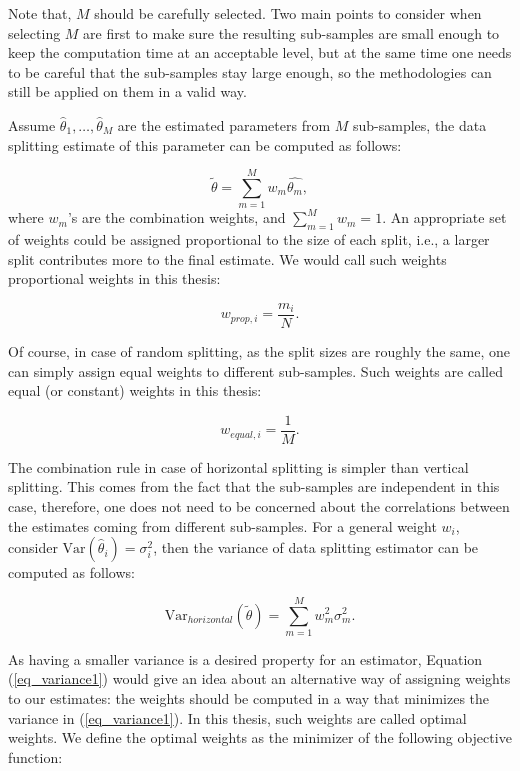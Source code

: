 \documentclass[11pt,a5paper,twoside]{book}
\begin{document}
Note that, $M$ should be carefully selected. Two main points to consider when selecting $M$ are first to make sure the resulting sub-samples are small enough to keep the computation time at an acceptable level, but at the same time one needs to be careful that the sub-samples stay large enough, so the methodologies can still be applied on them in a valid way.

Assume $\widehat{\theta}_1, \ldots, \widehat{\theta}_M$ are the estimated parameters from $M$ sub-samples, the data splitting estimate of this parameter can be computed as follows:

\begin{equation}
\label{eq_estimate}
\widetilde{\theta} = \sum_{m=1}^M w_m\widehat{\theta_m},
\end{equation}
where $w_m$'s are the combination weights, and $\sum_{m=1}^M w_m = 1$. An appropriate set of weights could be assigned proportional to the size of each split, i.e., a larger split contributes more to the final estimate. We would call such weights proportional weights in this thesis:

\begin{equation}
\label{eq_prop_w} 
w_{prop, i} = \frac{m_i}{N}.
\end{equation}

Of course, in case of random splitting, as the split sizes are roughly the same, one can simply assign equal weights to different sub-samples. Such weights are called equal (or constant) weights in this thesis:

\begin{equation}
\label{eq_equal_w}
w_{equal,i} = \frac{1}{M}.
\end{equation}

The combination rule in case of horizontal splitting is simpler than vertical splitting. This comes from the fact that the sub-samples are independent in this case, therefore, one does not need to be concerned about the correlations between the estimates coming from different sub-samples. For a general weight $w_i$, consider $\mathrm{Var}(\widehat{\theta}_i) = \sigma^2_i$, then the variance of data splitting estimator can be computed as follows:

\begin{equation}
\label{eq_variance1}
\mathrm{Var}_{horizontal}(\widetilde{\theta}) = \sum_{m=1}^M w_m^2 \sigma_m^2.
\end{equation}

As having a smaller variance is a desired property for an estimator, Equation (\ref{eq_variance1}) would give an idea about an alternative way of assigning weights to our estimates: the weights should be computed in a way that minimizes the variance in (\ref{eq_variance1}). In this thesis, such weights are called optimal weights. We define the optimal weights as the minimizer of the following objective function:
\end{document}
